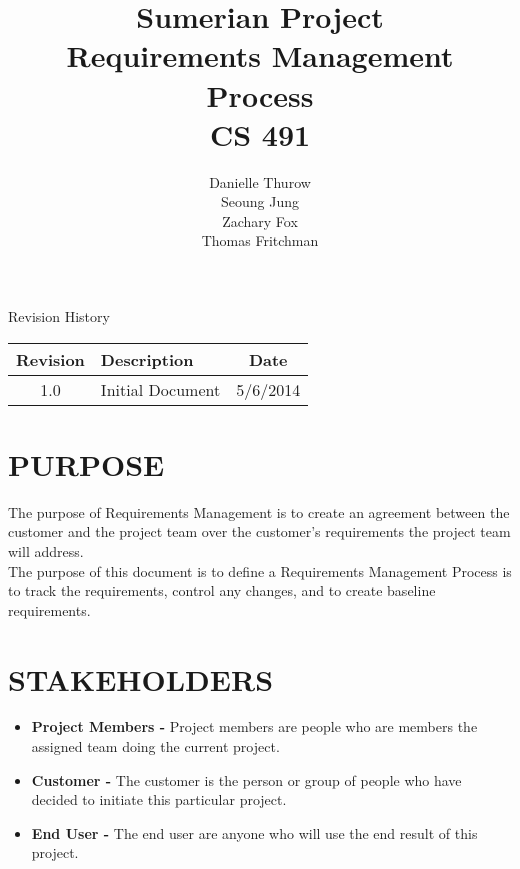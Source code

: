 \documentclass[11pt]{article}
\title{Sumerian Project\\
		Requirements Management Process\\
		CS 491}
\author{Danielle Thurow \\
		  Seoung Jung\\
		  Zachary Fox\\
		  Thomas Fritchman}
\date{}
\begin{document}
\maketitle

\newpage

\tableofcontents

\newpage

\begin{center}

\Large Revision History\\
\begin{tabularx}{\textwidth}{|c|X|c|}
	\hline
	\textbf{Revision} & \textbf{Description} & \textbf{Date}\\ \hline
	1.0 & Initial Document & 5/6/2014\\ \hline
\end{tabularx}


\end{center}

\newpage



\section{PURPOSE} 
The purpose of Requirements Management is to create an agreement between the customer and the project team over the customer's requirements the project team will address.\\
 
The purpose of this document is to define a Requirements Management Process is to track the requirements, control any changes, and to create baseline requirements.

\section{STAKEHOLDERS}  

\begin{itemize}

\item \textbf{Project Members -} Project members are people who are members the assigned team doing the current project. 

\item \textbf{Customer -} The customer is the person or group of people who have decided to initiate this particular project.

\item \textbf{End User -} The end user are anyone who will use the end result of this project.

\end{itemize}
\end{document}
